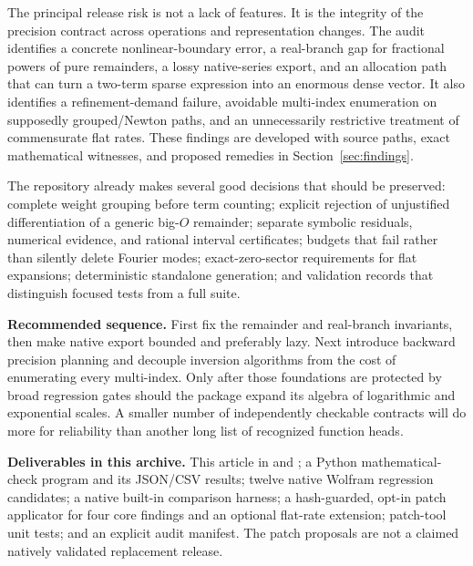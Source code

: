 \documentclass[11pt,letterpaper]{article}
\newcommand{\code}[1]{\texttt{\small\detokenize{#1}}}
\begin{document}
The principal release risk is not a lack of features. It is the integrity of the precision contract across operations and representation changes. The audit identifies a concrete nonlinear-boundary error, a real-branch gap for fractional powers of pure remainders, a lossy native-series export, and an allocation path that can turn a two-term sparse expression into an enormous dense vector. It also identifies a refinement-demand failure, avoidable multi-index enumeration on supposedly grouped/Newton paths, and an unnecessarily restrictive treatment of commensurate flat rates. These findings are developed with source paths, exact mathematical witnesses, and proposed remedies in Section~\ref{sec:findings}.

The repository already makes several good decisions that should be preserved: complete weight grouping before term counting; explicit rejection of unjustified differentiation of a generic big-$O$ remainder; separate symbolic residuals, numerical evidence, and rational interval certificates; budgets that fail rather than silently delete Fourier modes; exact-zero-sector requirements for flat expansions; deterministic standalone generation; and validation records that distinguish focused tests from a full suite.\cite{repo-core,repo-ops,repo-fourier,repo-flat,repo-cert,repo-validation}

\textbf{Recommended sequence.} First fix the remainder and real-branch invariants, then make native export bounded and preferably lazy. Next introduce backward precision planning and decouple inversion algorithms from the cost of enumerating every multi-index. Only after those foundations are protected by broad regression gates should the package expand its algebra of logarithmic and exponential scales. A smaller number of independently checkable contracts will do more for reliability than another long list of recognized function heads.

\begin{notebox}
\textbf{Deliverables in this archive.} This article in \code{.tex} and \code{.pdf}; a Python mathematical-check program and its JSON/CSV results; twelve native Wolfram regression candidates; a native built-in comparison harness; a hash-guarded, opt-in patch applicator for four core findings and an optional flat-rate extension; patch-tool unit tests; and an explicit audit manifest. The patch proposals are not a claimed natively validated replacement release.
\end{notebox}

\clearpage\begingroup\setlength{\parskip}{0pt}\tableofcontents\endgroup\clearpage
\end{document}
